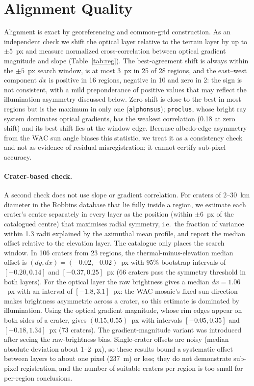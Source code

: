 \documentclass[10pt]{article}
\begin{document}
\section{Alignment Quality}
Alignment is exact by georeferencing and common-grid construction. As an
independent check we shift the optical layer relative to the terrain layer by
up to $\pm5$~px and measure normalized cross-correlation between optical
gradient magnitude and slope (Table~\ref{tab:reg}). The best-agreement shift is always within the $\pm5$~px search window, is
at most 3~px in 25 of 28 regions, and the east--west component $dx$ is positive
in 16 regions, negative in 10 and zero in 2: the sign is not consistent, with a
mild preponderance of positive values that may reflect the illumination
asymmetry discussed below. Zero shift is
close to the best in most regions but is the maximum in only one
(\texttt{alphonsus}); \texttt{proclus}, whose bright ray system dominates optical
gradients, has the weakest correlation (0.18 at zero shift) and its best shift
lies at the window edge. Because albedo-edge asymmetry from the WAC sun angle
biases this statistic, we treat it as a consistency check and not as evidence
of residual misregistration; it cannot certify sub-pixel accuracy.

\paragraph{Crater-based check.}
A second check does not use slope or gradient correlation. For craters of
2--30~km diameter in the Robbins database \cite{robbins2019craters} that lie
fully inside a region, we estimate each crater's centre separately in every
layer as the position (within $\pm6$~px of the catalogued centre) that
maximises radial symmetry, i.e.\ the fraction of variance within 1.3 radii
explained by the azimuthal mean profile, and report the median offset relative
to the elevation layer. The catalogue only places the search window.
In 106 craters from 23 regions, the thermal-minus-elevation median offset is
$(dy,dx)=(-0.02,-0.02)$~px with 95\% bootstrap intervals of
$[-0.20,0.14]$ and $[-0.37,0.25]$~px (66 craters pass the symmetry threshold
in both layers). For the optical layer the raw brightness gives a median
$dx=1.06$~px with an interval of $[-1.8,3.1]$~px: the WAC mosaic's fixed sun
direction makes brightness asymmetric across a crater, so this estimate is
dominated by illumination. Using the optical gradient magnitude, whose rim
edges appear on both sides of a crater, gives $(0.15, 0.55)$~px with intervals
$[-0.05,0.35]$ and $[-0.18,1.34]$~px (73 craters). The gradient-magnitude
variant was introduced after seeing the raw-brightness bias. Single-crater
offsets are noisy (median absolute deviation about 1--2~px), so these results
bound a systematic offset between layers to about one pixel (237~m) or less;
they do not demonstrate sub-pixel registration, and the number of suitable
craters per region is too small for per-region conclusions.
\begin{table}[H]\centering\small

\caption{Cross-modal shift check per region (1~px $\approx$ 237~m).}\label{tab:reg}
\end{table}
\end{document}
